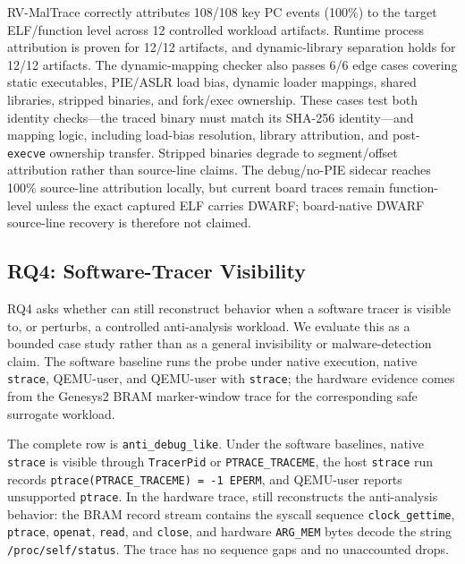 RV-MalTrace correctly attributes 108/108 key PC events (100\%) to the target
ELF/function level across 12 controlled workload artifacts. Runtime process
attribution is proven for 12/12 artifacts, and dynamic-library separation holds
for 12/12 artifacts. The dynamic-mapping checker also passes 6/6 edge cases
covering static executables, PIE/ASLR load bias, dynamic loader mappings, shared
libraries, stripped binaries, and fork/exec ownership. These cases test both
identity checks---the traced binary must match its SHA-256 identity---and mapping
logic, including load-bias resolution, library attribution, and post-\texttt{execve}
ownership transfer. Stripped binaries degrade to segment/offset attribution
rather than source-line claims. The debug/no-PIE sidecar reaches 100\%
source-line attribution locally, but current board traces remain function-level
unless the exact captured ELF carries DWARF; board-native DWARF source-line
recovery is therefore not claimed.

\subsection{RQ4: Software-Tracer Visibility}
\label{subsec:rq4-evasion-comparison}

RQ4 asks whether \rvmt can still reconstruct behavior when a software tracer is
visible to, or perturbs, a controlled anti-analysis workload. We evaluate this as
a bounded case study rather than as a general invisibility or malware-detection
claim. The software baseline runs the probe under native execution, native
\texttt{strace}, QEMU-user, and QEMU-user with \texttt{strace}; the hardware
evidence comes from the Genesys2 BRAM marker-window trace for the corresponding
safe surrogate workload.



The complete row is \texttt{anti\_debug\_like}. Under the software baselines,
native \texttt{strace} is visible through \texttt{TracerPid} or
\texttt{PTRACE\_TRACEME}, the host \texttt{strace} run records
\texttt{ptrace(PTRACE\_TRACEME) = -1 EPERM}, and QEMU-user reports unsupported
\texttt{ptrace}. In the hardware trace, \rvmt still reconstructs the
anti-analysis behavior: the BRAM record stream contains the syscall sequence
\texttt{clock\_gettime}, \texttt{ptrace}, \texttt{openat}, \texttt{read}, and
\texttt{close}, and hardware \texttt{ARG\_MEM} bytes decode the string
\texttt{/proc/self/status}. The trace has no sequence gaps and no unaccounted
drops.

